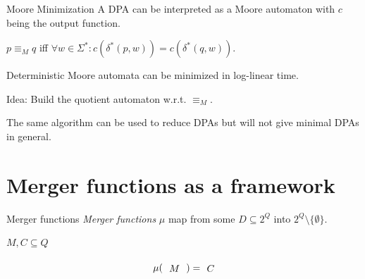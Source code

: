 \begin{frame}{Moore Minimization}
A DPA can be interpreted as a Moore automaton with $c$ being the output function.

\begin{defn}
	$p \equiv_M q$ iff $\forall w \in \Sigma^*: c(\delta^*(p, w)) = c(\delta^*(q, w))$.
\end{defn}

\vspace{.5cm}
\pause

\begin{theorem}
	Deterministic Moore automata can be minimized in log-linear time.
\end{theorem}

Idea: Build the quotient automaton w.r.t. $\equiv_M$.

\vspace{.5cm}

The same algorithm can be used to reduce DPAs but will not give minimal DPAs in general.
\end{frame}




\section{Merger functions as a framework}
\begin{frame}{Merger functions}
\emph{Merger functions} $\mu$ map from some $D \subseteq 2^Q$ into $2^Q \setminus \{\emptyset\}$.

\vspace{.5cm}

$M, C \subseteq Q$

\begin{equation*}
\tikz[baseline]{\node {$\mu($}} \tikz[baseline]{\node(d4) {$M$}} \tikz[baseline]{\node {$) =$}} \tikz[baseline]{\node(d5){$C$}}
\end{equation*}


\vfill
\end{frame}


